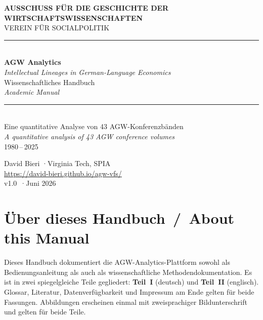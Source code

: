 \documentclass[11pt,a4paper,twoside]{article}
\newcommand{\guideversion}{v1.0}
\newcommand{\guidedate}{Juni 2026}
\newcommand{\siteurl}{https://david-bieri.github.io/agw-vfs/}
\begin{document}
\sffamily{}

\begin{titlepage}
\thispagestyle{empty}
\centering
\vspace*{2.2cm}
{\sffamily\small\color{accent}\bfseries AUSSCHUSS FÜR DIE GESCHICHTE DER WIRTSCHAFTSWISSENSCHAFTEN}\\[2pt]
{\sffamily\small\color{accent}VEREIN FÜR SOCIALPOLITIK}\\[1.6cm]

{\color{rulegrey}\rule{0.5\textwidth}{0.8pt}}\\[0.9cm]
{\rmfamily\fontsize{46}{50}\selectfont\bfseries\color{navy}AGW Analytics}\\[0.35cm]
{\sffamily\large\color{navydark}\itshape Intellectual Lineages in German-Language Economics}\\[0.55cm]
{\sffamily\Large\color{navydark}Wissenschaftliches Handbuch}\\[2pt]
{\sffamily\large\color{accent}\itshape Academic Manual}\\[0.9cm]
{\color{rulegrey}\rule{0.5\textwidth}{0.8pt}}\\[1.4cm]

{\sffamily\normalsize\color{navydark}Eine quantitative Analyse von 43 AGW-Konferenzbänden}\\
{\sffamily\normalsize\color{navydark}\itshape A quantitative analysis of 43 AGW conference volumes}\\[0.3cm]
{\sffamily\small\color{accent}1980\,--\,2025}

\vfill
{\sffamily\small\color{navydark}David Bieri \quad·\quad Virginia Tech, SPIA}\\[2pt]
{\sffamily\footnotesize\color{accent}\href{\siteurl}{\siteurl}}\\[10pt]
{\sffamily\footnotesize\color{navydark}\guideversion\ \quad·\quad \guidedate}
\end{titlepage}

\rmfamily
{}
\tableofcontents
\clearpage
\listoffigures
\vspace{1.5em}

\section*{Über dieses Handbuch \,/\, About this Manual}
Dieses Handbuch dokumentiert die AGW-Analytics-Plattform sowohl als Bedienungsanleitung als auch als wissenschaftliche Methodendokumentation. Es ist in zwei spiegelgleiche Teile gegliedert: \textbf{Teil~I} (deutsch) und \textbf{Teil~II} (englisch). Glossar, Literatur, Datenverfügbarkeit und Impressum am Ende gelten für beide Fassungen. Abbildungen erscheinen einmal mit zweisprachiger Bildunterschrift und gelten für beide Teile.
\end{document}
